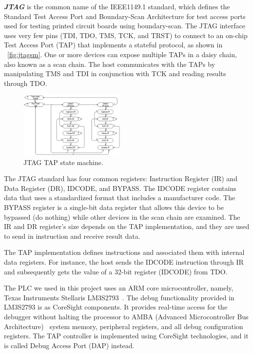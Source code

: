 \textbf{\textit{JTAG}} is the common name of the IEEE1149.1 standard, which defines the Standard Test Access Port and Boundary-Scan Architecture for test access ports used for testing printed circuit boards using boundary-scan. The JTAG interface uses very few pins (TDI, TDO, TMS, TCK, and TRST) to connect to an on-chip Test Access Port (TAP) that implements a stateful protocol, as shown in ~\autoref{fig:jtagsm}.  One or more devices can expose multiple TAPs in a daisy chain, also known as a scan chain. The host communicates with the TAPs by manipulating TMS and TDI in conjunction with TCK and reading results through TDO.


\begin{figure}[ht]
	\includegraphics[width=0.47\textwidth]{figures/jtagsm}
	\centering
	\caption{JTAG TAP state machine.}
	\label{fig:jtagsm}
\end{figure}


The JTAG standard has four common registers: Instruction Register (IR) and Data Register (DR),  IDCODE, and BYPASS. The IDCODE register contains data that uses a standardized format that includes a manufacturer code. The BYPASS register is a single-bit data register that allows this device to be bypassed (do nothing) while other devices in the scan chain are examined. The IR and DR register's size depends on the TAP implementation, and they are used to send in instruction and receive result data.

The TAP implementation defines instructions and associated them with internal data registers. For instance, the host sends the IDCODE instruction through IR and subsequently gets the value of a 32-bit register (IDCODE) from TDO.

The PLC we used in this project uses an ARM core microcontroller, namely, Texas Instruments Stellaris LM3S2793~\cite{lm3s2793}. The debug functionality provided in LM3S2793 is as CoreSight components. It provides real-time access for the debugger without halting the processor to AMBA (Advanced Microcontroller Bus Architecture)~\cite{flynn1997amba} system memory, peripheral registers, and all debug configuration registers. The TAP controller is implemented using CoreSight technologies, and it is called Debug Access Port (DAP) instead.


